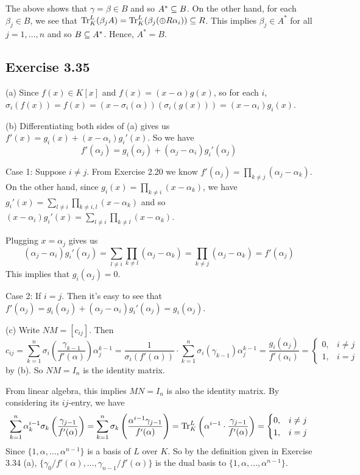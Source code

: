 \documentclass[../Marcus.tex]{subfiles}
\begin{document}
The above shows that $\gamma = \beta \in B$ and so $A^* \subseteq B$. On the other hand, for each $\beta_j \in B$, we see that $\operatorname{Tr}^L_K(\beta_j A) = \operatorname{Tr}^L_K(\beta_j (\oplus R\alpha_i)) \subseteq R$. This implies $\beta_j\in A^*$ for all $j=1,\ldots,n$ and so $B\subseteq A^*$. Hence, $A^*=B$.

\subsection*{Exercise 3.35}

(a) Since $f(x)\in K[x]$ and $f(x)=(x-\alpha)g(x)$, so for each $i$, $\sigma_i(f(x)) = f(x) = (x-\sigma_i(\alpha))(\sigma_i(g(x))) = (x-\alpha_i)g_i(x)$.

(b) Differentiating both sides of (a) gives us $f'(x) = g_i(x) + (x-\alpha_i)g_i'(x)$. So we have
$$
f'(\alpha_j) = g_i(\alpha_j) + (\alpha_j-\alpha_i)g_i'(\alpha_j)
$$

Case 1: Suppose $i\neq j$. From Exercise 2.20 we know $f'(\alpha_j) = \prod_{k\neq j} (\alpha_j-\alpha_k)$. On the other hand, since $g_i(x) = \prod_{k\neq i} (x-\alpha_k)$, we have $g_i'(x) = \sum_{l\neq i} \prod_{k\neq i,l} (x-\alpha_k)$ and so $(x-\alpha_i)g_i'(x) = \sum_{l\neq i} \prod_{k\neq l} (x-\alpha_k)$.

Plugging $x=\alpha_j$ gives us
$$
(\alpha_j-\alpha_i) g_i'(\alpha_j)
= \sum_{l\neq i} \prod_{k\neq l} (\alpha_j-\alpha_k)
= \prod_{k\neq j} (\alpha_j-\alpha_k)
= f'(\alpha_j)
$$
This implies that $g_i(\alpha_j) = 0$.

Case 2: If $i=j$. Then it's easy to see that $f'(\alpha_j) = g_i(\alpha_j) + (\alpha_j-\alpha_i)g_i'(\alpha_j) = g_i(\alpha_j)$.

(c) Write $NM=[c_{ij}]$. Then
$$
c_{ij}
= \sum_{k=1}^n \sigma_i\left( \frac{\gamma_{k-1}}{f'(\alpha)} \right) \alpha_j^{k-1}
= \frac{1}{ \sigma_i(f'(\alpha)) } \cdot \sum_{k=1}^n \sigma_i(\gamma_{k-1}) \alpha_j^{k-1}
= \frac{ g_i(\alpha_j) }{ f'(\alpha_i) }
=
\begin{cases}
		0, & i\neq j \\
		1, & i = j
\end{cases}
$$
by (b). So $NM=I_n$ is the identity matrix.

From linear algebra, this implies $MN=I_n$ is also the identity matrix. By considering its $ij$-entry, we have
$$
\sum_{k=1}^n \alpha_k^{i-1}\sigma_k \left( \frac{\gamma_{j-1}}{f'(\alpha)} \right)
= \sum_{k=1}^n \sigma_k \left( \frac{ \alpha^{i-1} \gamma_{j-1} }{ f'(\alpha) } \right)
= \operatorname{Tr}^L_K \left( \alpha^{i-1} \cdot \frac{\gamma_{j-1}}{f'(\alpha)} \right)
=
\begin{cases}
		0, & i\neq j \\
		1, & i = j
\end{cases}
$$
Since $\{1,\alpha,\ldots,\alpha^{n-1}\}$ is a basis of $L$ over $K$. So by the definition given in Exercise 3.34 (a), $\{\gamma_0/f'(\alpha),\ldots,\gamma_{n-1}/f'(\alpha)\}$ is the dual basis to $\{1,\alpha,\ldots,\alpha^{n-1}\}$.
\end{document}

